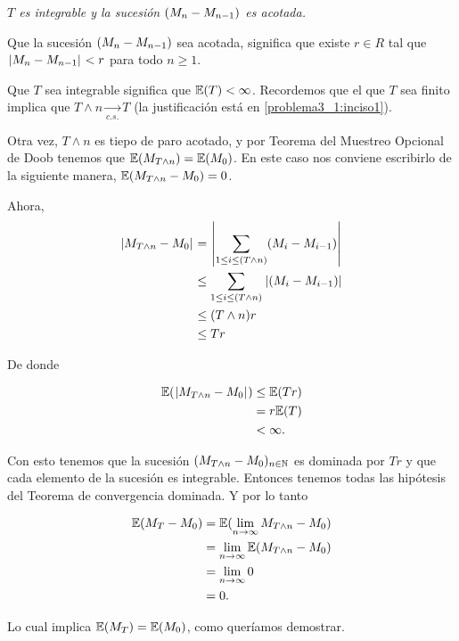 \emph{
    $T$ es integrable y la sucesi\'on $\left( M_n-M_{n-1}\right) $ es acotada.
}

\afterstatement\pn

Que la sucesión $\left( M_n-M_{n-1}\right) $ sea acotada, significa que existe $r \in R$ tal que
$\hspace{.25mm}\left|M_n - M_{n-1}\right|\hspace{.25mm} < r$ para todo $n \geq 1$.\pn

Que $T$ sea integrable significa que $\mathbb{E}(T) < \infty$. Recordemos que el que $T$ sea finito implica que 
$T \wedge n \underset{c.s.}\longrightarrow T$ (la justificación está en \ref{problema3_1:inciso1}). \pn

Otra vez, $T \wedge n$ es tiepo de paro acotado, y por Teorema del Muestreo Opcional de Doob tenemos que 
$\mathbb{E}(M_{T \wedge n}) = \mathbb{E}(M_0)$. En este caso nos conviene escribirlo de la siguiente manera, 
$\mathbb{E}(M_{T \wedge n} - M_0) = 0$.\pn

Ahora, 
\begin{align}
    \hspace{.25mm}\left|M_{T \wedge n} - M_0\right|\hspace{.25mm}  &=      \hspace{.25mm}\left|\sum_{1 \leq i \leq (T \wedge n)} (M_i - M_{i-1})\right|\hspace{.25mm}     \\
                                &\leq   \sum_{1 \leq i \leq (T \wedge n)} \hspace{.25mm}\left|(M_i - M_{i-1})\right|\hspace{.25mm}     \\
                                &\leq   (T \wedge n) r                                              \\      
                                &\leq   T r                                                    
\end{align}

De donde 

\begin{align}
        \mathbb{E}(\hspace{.25mm}\left|M_{T \wedge n} - M_0\right|\hspace{.25mm})  &\leq   \mathbb{E}(T r) \\
                                        &= r \mathbb{E}(T)      \\
                                        &< \infty.
\end{align} \pn

Con esto tenemos que la sucesión $(M_{T \wedge n} - M_0)_{n \in \mathbb{N}}$ es dominada por $Tr$ y que cada 
elemento de la sucesión es integrable. Entonces tenemos todas las hipótesis del Teorema de convergencia dominada.
Y por lo tanto

\begin{align}
        \mathbb{E}(M_T - M_0)   &=  \mathbb{E}(\lim_{n \rightarrow \infty} M_{T \wedge n} - M_0)        \\
                        &=  \lim_{n \rightarrow \infty} \mathbb{E}(M_{T \wedge n} - M_0)        \\
                        &=  \lim_{n \rightarrow \infty} 0                               \\
                        &=  0.                        
\end{align}\pn

Lo cual implica $\mathbb{E}(M_T) = \mathbb{E}(M_0)$, como queríamos demostrar.